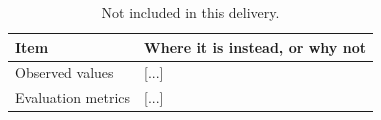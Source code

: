 %

\begin{table}[h!]
\centering
\renewcommand{\arraystretch}{1.2}
\caption{Not included in this delivery.}
\label{tab:not-included}
\begin{tabular}{@{}p{4.5cm}p{9cm}@{}}
\toprule
\textbf{Item} & \textbf{Where it is instead, or why not} \\ \midrule
Observed values & [...] \\
Evaluation metrics & [...] \\
\bottomrule
\end{tabular}
\end{table}
